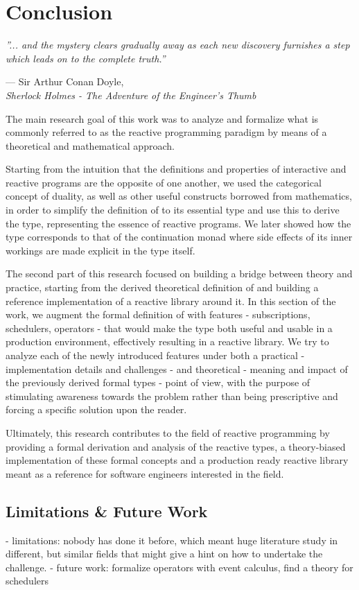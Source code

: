 \let\textcircled=\pgftextcircled
\chapter*{Conclusion}
\label{chap:discussion}

\epigraph{\hspace{4ex}\textit{''... and the mystery clears gradually away as each new discovery furnishes a step which leads on to the complete truth.''}}{--- Sir Arthur Conan Doyle,\\ \textit{Sherlock Holmes - The Adventure of the Engineer's Thumb}}

The main research goal of this work was to analyze and formalize what is commonly referred to as the reactive programming paradigm by means of a theoretical and mathematical approach. 

Starting from the intuition that the definitions and properties of interactive and reactive programs are the opposite of one another, we used the categorical concept of duality, as well as other useful constructs borrowed from mathematics, in order to simplify the definition of  to its essential type and use this to derive the  type, representing the essence of reactive programs. We later showed how the  type corresponds to that of the continuation monad where side effects of its inner workings are made explicit in the type itself.

The second part of this research focused on building a bridge between theory and practice, starting from the derived theoretical definition of  and building a reference implementation of a reactive library around it. In this section of the work, we augment the formal definition of  with features - subscriptions, schedulers, operators - that would make the type both useful and usable in a production environment, effectively resulting in a reactive library. We try to analyze each of the newly introduced features under both a practical - implementation details and challenges - and theoretical - meaning and impact of the previously derived formal types - point of view, with the purpose of stimulating awareness towards the problem rather than being prescriptive and forcing a specific solution upon the reader.

Ultimately, this research contributes to the field of reactive programming by providing a formal derivation and analysis of the reactive types, a theory-biased implementation of these formal concepts and a production ready reactive library meant as a reference for software engineers interested in the field.

\section*{Limitations \& Future Work}
\label{future-work}

- limitations: nobody has done it before, which meant huge literature study in different, but similar fields that might give a hint on how to undertake the challenge.
- future work: formalize operators with event calculus, find a theory for schedulers
